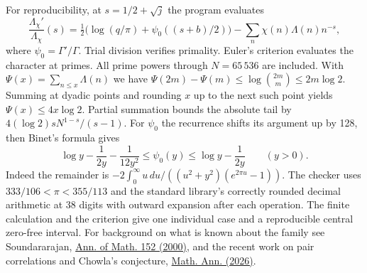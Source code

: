 For reproducibility, at $s=1/2+\sqrt j$ the program evaluates
\[
  \frac{\Lambda_\chi'}{\Lambda_\chi}(s)
  =\tfrac12\bigl(\log(q/\pi)+\psi_0((s+b)/2)\bigr)
    -\sum_n\chi(n)\Lambda(n)n^{-s},
\]
where $\psi_0=\Gamma'/\Gamma$. Trial division verifies primality.
Euler's criterion evaluates the character at primes. All prime powers
through $N=65\,536$ are included. With $\Psi(x)=\sum_{n\le x}\Lambda(n)$
we have $\Psi(2m)-\Psi(m)\le\log\binom{2m}{m}\le 2m\log2$.
Summing at dyadic points and rounding $x$ up to the next such point yields
$\Psi(x)\le4x\log2$. Partial summation bounds the absolute tail by
$4(\log 2)sN^{1-s}/(s-1)$. For $\psi_0$ the recurrence shifts its argument
up by 128, then Binet's formula gives
\[
  \log y-\frac{1}{2y}-\frac{1}{12y^2}
     \le\psi_0(y)\le\log y-\frac{1}{2y}\qquad (y>0).
\]
Indeed the remainder is
$-2\int_0^\infty u\,du/((u^2+y^2)(e^{2\pi u}-1))$.
The checker uses $333/106<\pi<355/113$ and the standard library's
correctly rounded decimal arithmetic at 38 digits with outward expansion
after each operation. The finite calculation and the criterion give one
individual case and a reproducible central zero-free interval.
For background on what is known about the family see Soundararajan,
\href{https://doi.org/10.2307/2261390}{Ann. of Math. 152 (2000)},
and the recent work on pair correlations and Chowla's conjecture,
\href{https://doi.org/10.1007/s00208-026-03383-y}{Math. Ann. (2026)}.
